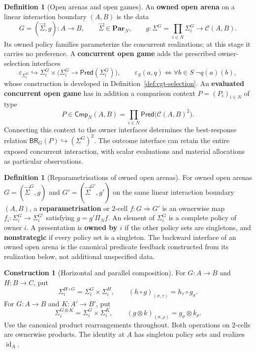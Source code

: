 \documentclass[11pt,a4paper]{article}
\numberwithin{equation}{section}
\theoremstyle{definition}
\newtheorem{definition}[theorem]{Definition}
\newtheorem{construction}[construction]{Construction}
\theoremstyle{remark}
\theoremstyle{plain}
\begin{document}
\begin{definition}[Open arenas and open games]
\label{def:egt-open-game-vocabulary}
An \textbf{owned open arena} on a linear interaction boundary $(A,B)$ is
the data
\[
 G=(\vec\Sigma,g):A\to B,\qquad
 \vec\Sigma\in\mathbf{Par}_N,\qquad
 g:\Sigma^G=\prod_{i\in N}\Sigma_i^G\longrightarrow\mathcal C(A,B).
\]
Its owned policy families parameterize the concurrent realizations; at
this stage it carries no preference. A \textbf{concurrent open game}
adds the prescribed owner-selection interfaces
\[
 \varepsilon_{\Sigma_i^G}\hookrightarrow
 \Sigma_i^G\times
 \bigl(\Sigma_i^G\to\mathsf{Pred}(\Sigma_i^G)\bigr),
 \qquad
 \varepsilon_S(a,q)\iff\forall b\in S\;\neg q(a)(b),
\]
whose construction is developed in
Definition~\ref{def:cgt-selection}. An \textbf{evaluated concurrent
open game} has in addition a comparison context $P=(P_i)_{i\in N}$ of
type
\[
 P\in\mathsf{Cmp}_N(A,B)
 =\prod_{i\in N}\mathsf{Pred}\bigl(\mathcal C(A,B)^2\bigr).
\]
Connecting this context to the owner interfaces determines the
best-response relation $\mathsf{BR}_G(P)\hookrightarrow(\Sigma^G)^2$.
The outcome interface can retain the entire exposed concurrent interaction, with scalar evaluations and material allocations as particular observations.
\end{definition}
\begin{definition}[Reparametrisations of owned open arenas]
\label{def:egt-concurrent-open-arena-and-reparametrisation}
For owned open arenas $G=(\vec\Sigma^G,g)$ and
$G'=(\vec\Sigma^{G'},g')$ on the same linear interaction boundary
$(A,B)$, a \textbf{reparametrisation} or $2$-cell
$f:G\Rightarrow G'$ is an ownerwise map
$f_i:\Sigma_i^G\to\Sigma_i^{G'}$ satisfying $g=g'\Pi_Nf$.
An element of $\Sigma_i^G$ is a complete policy of owner $i$.
A presentation is \textbf{owned by $i$} if the other policy sets are
singletons, and \textbf{nonstrategic} if every policy set is a singleton.
The backward interface of an owned open arena is the canonical predicate
feedback constructed from its realization below, not additional
unspecified data.
\end{definition}

\begin{construction}[Horizontal and parallel composition]
For $G:A\to B$ and $H:B\to C$, put
\[
 \Sigma_i^{H\circ G}=\Sigma_i^G\times\Sigma_i^H,
 \qquad (h\circ g)_{(\sigma,\tau)}=h_\tau\circ g_\sigma.
\]
For $G:A\to B$ and $K:A'\to B'$, put
\[
 \Sigma_i^{G\otimes K}=\Sigma_i^G\times\Sigma_i^K,
 \qquad(g\otimes k)_{(\sigma,\rho)}=g_\sigma\otimes k_\rho.
\]
Use the canonical product rearrangements throughout. Both operations on
$2$-cells are ownerwise products. The identity at $A$ has singleton policy
sets and realizes $\operatorname{id}_A$.
\end{construction}
\end{document}
